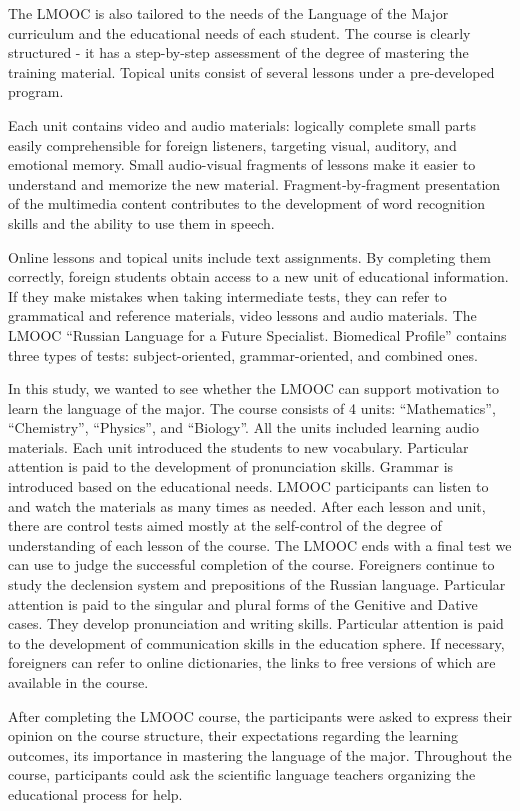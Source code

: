 \documentclass[english]{textolivre}
\begin{document}
The LMOOC is also tailored to the needs of the Language of the Major curriculum and the educational needs of each student. The course is clearly structured - it has a step-by-step assessment of the degree of mastering the training material. Topical units consist of several lessons under a pre-developed program.

Each unit contains video and audio materials: logically complete small parts easily comprehensible for foreign listeners, targeting visual, auditory, and emotional memory. Small audio-visual fragments of lessons make it easier to understand and memorize the new material. Fragment‑by‑fragment presentation of the multimedia content contributes to the development of word recognition skills and the ability to use them in speech.

Online lessons and topical units include text assignments. By completing them correctly, foreign students obtain access to a new unit of educational information. If they make mistakes when taking intermediate tests, they can refer to grammatical and reference materials, video lessons and audio materials. The LMOOC “Russian Language for a Future Specialist. Biomedical Profile” contains three types of tests: subject-oriented, grammar-oriented, and combined ones.

In this study, we wanted to see whether the LMOOC can support motivation to learn the language of the major. The course consists of 4 units: “Mathematics”, “Chemistry”, “Physics”, and “Biology”. All the units included learning audio materials. Each unit introduced the students to new vocabulary. Particular attention is paid to the development of pronunciation skills. Grammar is introduced based on the educational needs. LMOOC participants can listen to and watch the materials as many times as needed. After each lesson and unit, there are control tests aimed mostly at the self-control of the degree of understanding of each lesson of the course. The LMOOC ends with a final test we can use to judge the successful completion of the course. Foreigners continue to study the declension system and prepositions of the Russian language. Particular attention is paid to the singular and plural forms of the Genitive and Dative cases. They develop pronunciation and writing skills. Particular attention is paid to the development of communication skills in the education sphere. If necessary, foreigners can refer to online dictionaries, the links to free versions of which are available in the course.

After completing the LMOOC course, the participants were asked to express their opinion on the course structure, their expectations regarding the learning outcomes, its importance in mastering the language of the major. Throughout the course, participants could ask the scientific language teachers organizing the educational process for help.
\end{document}
